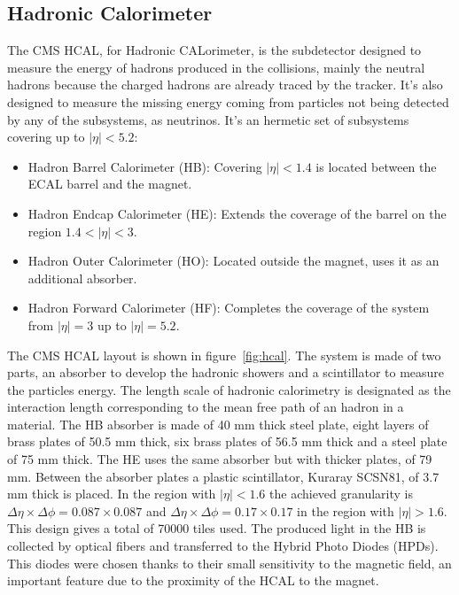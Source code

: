 \subsection{Hadronic Calorimeter}
\label{sec:hcal}

The CMS HCAL, for Hadronic CALorimeter, is the subdetector designed to measure the energy of hadrons produced in the collisions, mainly the neutral hadrons because the charged hadrons are already traced by the tracker. It's also designed to measure the missing energy coming from particles not being detected by any of the subsystems, as neutrinos. It's an hermetic set of subsystems covering up to $|\eta|<5.2$:
\begin{itemize}
\item Hadron Barrel Calorimeter (HB): Covering $|\eta|<1.4$ is located between the ECAL barrel and the magnet. 
\item Hadron Endcap Calorimeter (HE): Extends the coverage of the barrel on the region $1.4<|\eta|<3$.
\item Hadron Outer Calorimeter (HO): Located outside the magnet, uses it as an additional absorber.
\item Hadron Forward Calorimeter (HF): Completes the coverage of the system from $|\eta|=3$ up to $|\eta|=5.2$.
\end{itemize}

The CMS HCAL layout is shown in figure~\ref{fig:hcal}. The system is made of two parts, an absorber to develop the hadronic showers and a scintillator to measure the particles energy. The length scale of hadronic calorimetry is designated as the interaction length corresponding to the mean free path of an hadron in a material. The HB absorber is made of 40 mm thick steel plate, eight layers of brass plates of 50.5 mm thick, six brass plates of 56.5 mm thick and a steel plate of 75 mm thick. The HE uses the same absorber but with thicker plates, of 79 mm. Between the absorber plates a plastic scintillator, Kuraray SCSN81, of 3.7 mm thick is placed. In the region with $|\eta|<1.6$ the achieved granularity is $\Delta\eta\times\Delta\phi=0.087\times 0.087$ and $\Delta\eta\times\Delta\phi=0.17\times 0.17$ in the region with $|\eta|>1.6$. This design gives a total of 70000 tiles used. The produced light in the HB is collected by optical fibers and transferred to the Hybrid Photo Diodes (HPDs). This diodes were chosen thanks to their small sensitivity to the magnetic field, an important feature due to the proximity of the HCAL to the magnet.

